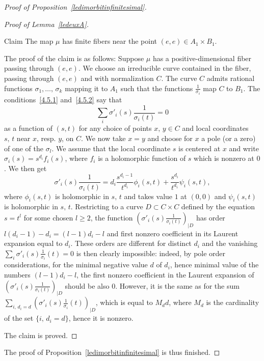 \begin{proof}[Proof of Proposition~\ref{ledimorbitinfinitesimal}]
\begin{proof}[Proof of Lemma~\ref{ledeuxA}]
\begin{enonce}{Claim}\label{claim}
The map $\mu$ has finite fibers near the point $(e,e)\in A_1\times B_1$.
\end{enonce}

The proof of the claim is as follows: Suppose $\mu$ has a positive-dimensional fiber passing through $(e,e)$. We choose an irreducible curve contained in the fiber, passing through $(e,e)$ and with normalization $C$. The curve $C$ admits rational functions $\sigma_1,\dots,\,\sigma_k$ mapping it to $A_1$ such that the functions $\frac{1}{\sigma_i}$ map $C$ to $B_1$.
The conditions~\eqref{4.5.1} and~\eqref{4.5.2} say that
\[
\sum_i\sigma'_i(s)\frac{1}{\sigma_i(t)}=0
\]
as a function of $(s,t)$ for any choice of points $x,\,y\in C$ and local coordinates $s,\,t$ near $x$, resp. $y$, on $C$. We now take $x=y$ and choose for $x$ a pole (or a zero) of one of the $\sigma_l$. We assume that the local coordinate $s$ is centered at $x$ and write
$\sigma_i(s)=s^{d_i}f_i(s)$, where $f_i$ is a holomorphic function of $s$ which is nonzero at $0$. We then get
\begin{equation}\label{eqpourfonction}
\sigma'_i(s)\frac{1}{\sigma_i(t)}=d_i \frac{s^{d_i-1}}{t^{d_i}} \phi_i(s,t)+\frac{s^{d_i}}{t^{d_i}}\psi_i(s,t),
\end{equation}
where $\phi_i(s,t)$ is holomorphic in $s,\,t$ and takes value $1$ at $(0,0)$ and $\psi_i(s,t)$ is holomorphic in $s,\,t$. Restricting to a curve $D\subset C\times C$ defined by the equation $s=t^l$ for some chosen $l\geq2$, the function $(\sigma'_i(s)\frac{1}{\sigma_i(t)})_{\mid D}$ has order $l(d_i-1)-d_i=(l-1)d_i-l$ and first nonzero coefficient in its Laurent expansion equal to $d_i$. These orders are different for distinct $d_i$ and the vanishing $\sum_i\sigma'_i(s)\frac{1}{\sigma_i}(t)=0$ is then clearly impossible: indeed, by pole order considerations, for the minimal negative value $d$ of $d_i$, hence minimal value of the numbers $(l-1)d_i-l$, the first nonzero coefficient in the Laurent expansion of $(\sigma'_i(s)\frac{1}{\sigma_i(t)})_{\mid D}$ should be also $0$. However, it is the same as for the sum $\sum_{i,\,d_i=d}(\sigma'_i(s)\frac{1}{\sigma_i}(t))_{\mid D}$, which is equal to $M_d d$, where $M_d$ is the cardinality of the set $\{i,\,d_i=d\}$, hence it is nonzero.

The claim is proved.
\end{proof}

The proof of Proposition~\ref{ledimorbitinfinitesimal} is thus finished.
\end{proof}

